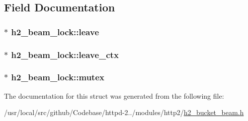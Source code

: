 \subsection{Field Documentation}
\subsubsection[{\texorpdfstring{leave}{leave}}]{$\ast$ h2\+\_\+beam\+\_\+lock\+::leave}\hypertarget{structh2__beam__lock_a83a115cf871f1df4a5ac961194bca84b}{}\label{structh2__beam__lock_a83a115cf871f1df4a5ac961194bca84b}
\subsubsection[{\texorpdfstring{leave\+\_\+ctx}{leave_ctx}}]{$\ast$ h2\+\_\+beam\+\_\+lock\+::leave\+\_\+ctx}\hypertarget{structh2__beam__lock_a471b5abe93ba44f242155423d4f1efa5}{}\label{structh2__beam__lock_a471b5abe93ba44f242155423d4f1efa5}
\subsubsection[{\texorpdfstring{mutex}{mutex}}]{$\ast$ h2\+\_\+beam\+\_\+lock\+::mutex}\hypertarget{structh2__beam__lock_a7c133e17917c7c200909e0670e8bdb9a}{}\label{structh2__beam__lock_a7c133e17917c7c200909e0670e8bdb9a}


The documentation for this struct was generated from the following file\+:\begin{DoxyCompactItemize}
\item 
/usr/local/src/github/\+Codebase/httpd-\/2../modules/http2/\hyperlink{h2__bucket__beam_8h}{h2\+\_\+bucket\+\_\+beam.\+h}\end{DoxyCompactItemize}
